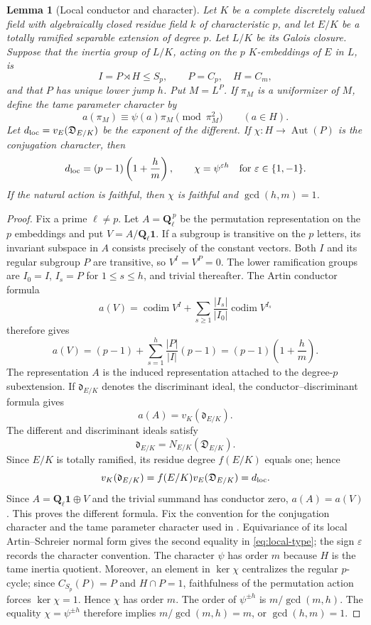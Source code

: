 \documentclass[11pt]{amsart}
\theoremstyle{plain}
\newtheorem{lemma}[theorem]{Lemma}
\theoremstyle{definition}
\numberwithin{equation}{section}
\begin{document}
\begin{lemma}[Local conductor and character]\label{lem:local}
Let $K$ be a complete discretely valued field with algebraically closed
residue field $k$ of characteristic $p$, and let $E/K$ be a totally ramified
separable extension of degree $p$.  Let $L/K$ be its Galois closure.  Suppose
that the inertia group of $L/K$, acting on the $p$ $K$-embeddings of $E$ in
$L$, is
\[
 I=P\rtimes H\leq S_p,\qquad P=C_p,\quad H=C_m,
\]
and that $P$ has unique lower jump $h$.  Put $M=L^P$.  If $\pi_M$ is a
uniformizer of $M$, define the tame parameter character by
\[
 a(\pi_M)\equiv\psi(a)\pi_M\pmod{\pi_M^2}\qquad(a\in H).
\]
Let $d_{\rm loc}=v_E(\mathfrak D_{E/K})$ be the exponent of the different.
If $\chi:H\to\operatorname{Aut}(P)$ is the conjugation character, then
\[
 d_{\rm loc}=(p-1)\left(1+\frac hm\right),\qquad
 \chi=\psi^{\varepsilon h}\quad\text{for }\varepsilon\in\{1,-1\}.
 \label{eq:local-type}
\]
If the natural action is faithful, then $\chi$ is faithful and
$\gcd(h,m)=1$.
\end{lemma}

\begin{proof}
Fix a prime $\ell\ne p$.  Let $A=\mathbf Q_\ell^{\,p}$ be the permutation
representation on the $p$ embeddings and put
$V=A/\mathbf Q_\ell\mathbf 1$.  If a subgroup is transitive on the $p$
letters, its invariant subspace in $A$ consists precisely of the constant
vectors.  Both $I$ and its regular subgroup $P$ are transitive, so
$V^I=V^P=0$.  The lower ramification groups are
$I_0=I$, $I_s=P$ for $1\leq s\leq h$, and trivial thereafter.  The Artin
conductor formula
\[
 a(V)=\operatorname{codim}V^I+
 \sum_{s\geq1}\frac{|I_s|}{|I_0|}\operatorname{codim}V^{I_s}
\]
therefore gives
\[
 a(V)=(p-1)+
 \sum_{s=1}^{h}\frac{|P|}{|I|}(p-1)
 =(p-1)\left(1+\frac hm\right).
\]
The representation $A$ is the induced representation attached to the
degree-$p$ subextension.  If $\mathfrak d_{E/K}$ denotes the discriminant
ideal, the conductor--discriminant formula gives
\[
 a(A)=v_K(\mathfrak d_{E/K}).
\]
The different and discriminant ideals satisfy
\[
 \mathfrak d_{E/K}=N_{E/K}(\mathfrak D_{E/K}).
\]
Since $E/K$ is totally
ramified, its residue degree $f(E/K)$ equals one; hence
\[
 v_K(\mathfrak d_{E/K})
 =f(E/K)v_E(\mathfrak D_{E/K})=d_{\rm loc}.
\]
Since
$A=\mathbf Q_\ell\mathbf 1\oplus V$ and the trivial summand has conductor
zero, $a(A)=a(V)$.  This proves the different formula.
Fix the convention for the conjugation character and the tame parameter
character used in \cite[Lemma 2.12]{WewersThree}.  Equivariance of its local
Artin--Schreier normal form gives the second equality in
\eqref{eq:local-type}; the sign $\varepsilon$ records the character
convention.  The character $\psi$ has
order $m$ because $H$ is the tame inertia quotient.  Moreover, an element in
$\ker\chi$ centralizes the regular $p$-cycle;
since $C_{S_p}(P)=P$ and $H\cap P=1$, faithfulness of the permutation action
forces $\ker\chi=1$.  Hence $\chi$ has order $m$.  The order of
$\psi^{\pm h}$ is $m/\gcd(m,h)$.  The equality
$\chi=\psi^{\pm h}$ therefore implies $m/\gcd(m,h)=m$, or
$\gcd(h,m)=1$.
\end{proof}
\end{document}
